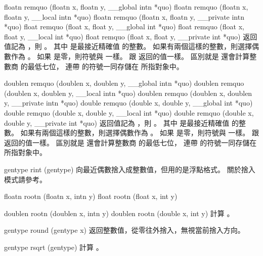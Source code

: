 floatn remquo (floatn x,
	floatn y,
	__global intn *quo)
floatn remquo (floatn x,
	floatn y,
	__local intn *quo)
floatn remquo (floatn x,
	floatn y,
	__private intn *quo)
float remquo (float x,
	float y,
	__global int *quo)
float remquo (float x,
	float y,
	__local int *quo)
float remquo (float x,
	float y,
	__private int *quo)
\stopbuffer
{}
返回值記為 ，則 。
其中  是最接近精確值  的整數。
如果有兩個這樣的整數，則選擇偶數作為 。
如果  是零，則符號與  一樣。
 跟  返回的值一樣。
區別就是  還會計算整數商  的最低七位，
連帶  的符號一同存儲在  所指對象中。
\stopbuffer

doublen remquo (doublen x,
	doublen y,
	__global intn *quo)
doublen remquo (doublen x,
	doublen y,
	__local intn *quo)
doublen remquo (doublen x,
	doublen y,
	__private intn *quo)
double remquo (double x,
	double y,
	__global int *quo)
double remquo (double x,
	double y,
	__local int *quo)
double remquo (double x,
	double y,
	__private int *quo)
\stopbuffer
{}
返回值記為 ，則 。
其中  是最接近精確值  的整數。
如果有兩個這樣的整數，則選擇偶數作為 。
如果  是零，則符號與  一樣。
 跟  返回的值一樣。
區別就是  還會計算整數商  的最低七位，
連帶  的符號一同存儲在  所指對象中。
\stopbuffer

gentype rint (gentype)
\stopbuffer
{}
向最近偶數捨入成整數值，但用的是浮點格式。
關於捨入模式請參考。
\stopbuffer

floatn rootn (floatn x, intn y)
float rootn (float x, int y)

doublen rootn (doublen x, intn y)
doublen rootn (double x, int y)
\stopbuffer
{}
計算 。
\stopbuffer

gentype round (gentype x)
\stopbuffer
{}
返回整數值，從零往外捨入，無視當前捨入方向。
\stopbuffer

gentype rsqrt (gentype)
\stopbuffer
{}
計算 。
\stopbuffer

